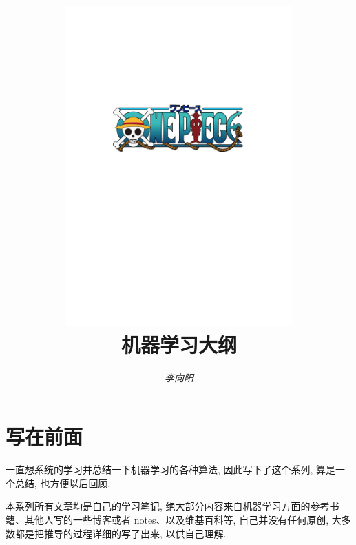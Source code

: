 \documentclass[a4paper,UTF8]{ctexart}
\theoremstyle{plain} \newtheorem{theorem}{定理}[section]
\theoremstyle{plain} \newtheorem{definition}{定义}[section]
\theoremstyle{plain} \newtheorem{lemma}{引理}[section]
\theoremstyle{plain} \newtheorem{proposition}{命题}[section]
\theoremstyle{plain} \newtheorem{example}{例}[section]
\theoremstyle{plain} \newtheorem{remark}{注}[section]
\theoremstyle{plain} \newtheorem{corollary}{推论}[section]
\begin{document}
\title{
\includegraphics[width=0.65\textwidth]{onepiece.pdf}\\
\vspace{2em}
\textbf{机器学习大纲}}
\author{\emph{李向阳} \quad \color{blue}{d1142845997@gmail.com}}
\date{}

\maketitle
\thispagestyle{empty}

\newpage


\tableofcontents

\newpage

\section{写在前面}
一直想系统的学习并总结一下机器学习的各种算法, 因此写下了这个系列, 算是一个总结, 也方便以后回顾.

本系列所有文章均是自己的学习笔记, 绝大部分内容来自机器学习方面的参考书籍、其他人写的一些博客或者 notes、以及维基百科等, 自己并没有任何原创, 大多数都是把推导的过程详细的写了出来, 以供自己理解.
\end{document}
